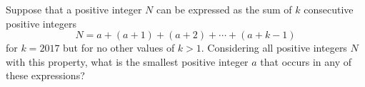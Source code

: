 Suppose that a positive integer $N$ can be expressed as the sum of $k$ consecutive positive integers
\[N=a+(a+1)+(a+2)+\cdots+(a+k-1)\]for $k=2017$ but for no other values of $k>1.$ Considering all positive integers $N$ with this property, what is the smallest positive integer $a$ that occurs in any of these expressions?